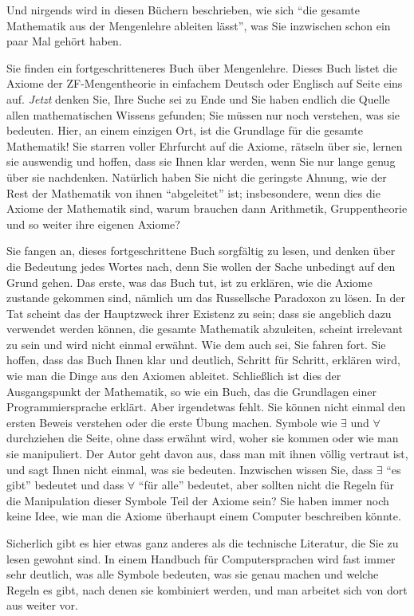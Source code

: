 Und nirgends wird in diesen Büchern beschrieben, wie sich "`die gesamte Mathematik aus der Mengenlehre ableiten lässt"', was Sie inzwischen schon ein paar Mal gehört haben.

Sie finden ein fortgeschritteneres Buch über Mengenlehre.  Dieses Buch listet die
Axiome der ZF-Mengentheorie in einfachem Deutsch oder Englisch auf Seite eins auf.  {\em Jetzt} denken Sie, Ihre Suche sei zu Ende und Sie haben endlich die Quelle allen mathematischen Wissens gefunden; Sie müssen nur noch verstehen, was sie bedeuten.  Hier, an einem einzigen Ort, ist die Grundlage für die gesamte Mathematik!  Sie starren voller Ehrfurcht auf die Axiome, rätseln über sie, lernen sie auswendig und hoffen, dass sie Ihnen klar werden, wenn Sie nur lange genug über sie nachdenken.  Natürlich haben Sie nicht die geringste Ahnung, wie der Rest der Mathematik von ihnen "`abgeleitet"' ist; insbesondere, wenn dies die Axiome der Mathematik sind, warum brauchen dann Arithmetik, Gruppentheorie und so weiter ihre eigenen Axiome?

Sie fangen an, dieses fortgeschrittene Buch sorgfältig zu lesen, und denken über die Bedeutung jedes Wortes nach, denn Sie wollen der Sache unbedingt auf den Grund gehen.
Das erste, was das Buch tut, ist zu erklären, wie die Axiome zustande gekommen sind, nämlich um das Russellsche Paradoxon zu lösen.  In der Tat scheint das der Hauptzweck ihrer Existenz zu sein; dass sie angeblich dazu verwendet werden können, die gesamte Mathematik abzuleiten, scheint irrelevant zu sein und wird nicht einmal erwähnt.  Wie dem auch sei, Sie fahren fort.  Sie hoffen, dass das Buch Ihnen klar und deutlich, Schritt für Schritt, erklären wird, wie man die Dinge aus den Axiomen ableitet.  Schließlich ist dies der Ausgangspunkt der Mathematik, so wie ein Buch, das die Grundlagen einer Programmiersprache erklärt.  Aber irgendetwas fehlt.  Sie können nicht einmal den ersten Beweis verstehen oder die erste Übung machen.  Symbole wie $\exists$ und $\forall$ durchziehen die Seite, ohne dass erwähnt wird, woher sie kommen oder wie man sie manipuliert. Der Autor geht davon aus, dass man mit ihnen völlig vertraut ist, und sagt Ihnen nicht einmal, was sie bedeuten.  Inzwischen wissen Sie, dass $\exists$ "`es gibt"' bedeutet und dass $\forall$ "`für alle"' bedeutet, aber sollten nicht die Regeln für die Manipulation dieser Symbole Teil der Axiome sein?  Sie haben immer noch keine Idee, wie man die Axiome überhaupt einem Computer beschreiben könnte.

Sicherlich gibt es hier etwas ganz anderes als die technische Literatur, die Sie zu lesen gewohnt sind.  In einem Handbuch für Computersprachen wird fast immer sehr deutlich, was alle Symbole bedeuten, was sie genau machen und welche Regeln es gibt, nach denen sie kombiniert werden, und man arbeitet sich von dort aus weiter vor.

